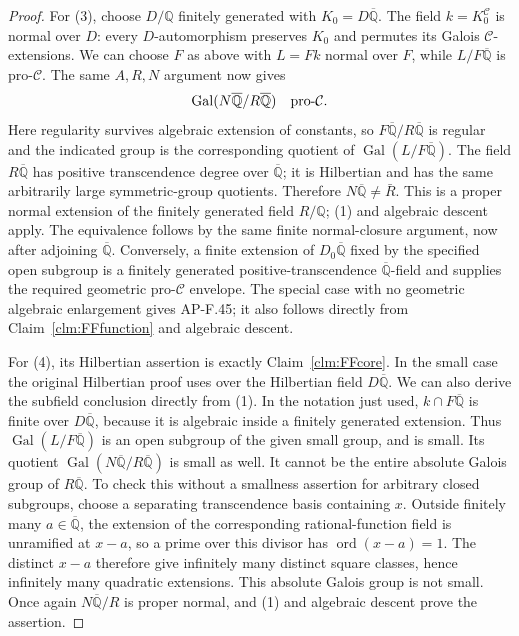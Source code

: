 \begin{proof}
For (3), choose \(D/\mathbb Q\) finitely generated with
\(K_0=D\overline{\mathbb Q}\). The field
\(k=K_0^{\mathcal C}\) is normal over \(D\): every
\(D\)-automorphism preserves \(K_0\) and permutes its
Galois \(\mathcal C\)-extensions. We can choose \(F\)
as above with \(L=Fk\) normal over \(F\), while
\(L/F\overline{\mathbb Q}\) is pro-\(\mathcal C\).
The same \(A,R,N\) argument now gives
\[
 \operatorname{Gal}
   (N\overline{\mathbb Q}/R\overline{\mathbb Q})
 \quad\hbox{pro-}\mathcal C.
\]
Here regularity survives algebraic extension of constants,
so \(F\overline{\mathbb Q}/R\overline{\mathbb Q}\)
is regular and the indicated group is the corresponding
quotient of \(\operatorname{Gal}
(L/F\overline{\mathbb Q})\). The field
\(R\overline{\mathbb Q}\) has positive transcendence
degree over \(\overline{\mathbb Q}\); it is Hilbertian
and has the same arbitrarily large symmetric-group quotients.
Therefore \(N\overline{\mathbb Q}\ne\bar R\).
This is a proper normal extension of the finitely generated
field \(R/\mathbb Q\); (1) and algebraic descent apply.
The equivalence follows by the same finite normal-closure
argument, now after adjoining \(\overline{\mathbb Q}\).
Conversely, a finite extension of
\(D_0\overline{\mathbb Q}\) fixed by the specified open
subgroup is a finitely generated positive-transcendence
\(\overline{\mathbb Q}\)-field and supplies the required
geometric pro-\(\mathcal C\) envelope. The special case
with no geometric algebraic enlargement gives AP-F.45;
it also follows directly from Claim~\ref{clm:FFfunction}
and algebraic descent.

For (4), its Hilbertian assertion is exactly
Claim~\ref{clm:FFcore}. In the small case the original
Hilbertian proof uses
\citet[Theorem~4.4]{FF_BarySoroker2008} over the Hilbertian
field \(D\overline{\mathbb Q}\). We can also derive
the subfield conclusion directly from (1).
In the notation just used, \(k\cap F\overline{\mathbb Q}\)
is finite over \(D\overline{\mathbb Q}\), because it
is algebraic inside a finitely generated extension.
Thus \(\operatorname{Gal}(L/F\overline{\mathbb Q})\)
is an open subgroup of the given small group, and is small.
Its quotient
\(\operatorname{Gal}(N\overline{\mathbb Q}/
R\overline{\mathbb Q})\) is small as well. It cannot
be the entire absolute Galois group of
\(R\overline{\mathbb Q}\). To check this without a
smallness assertion for arbitrary closed subgroups, choose
a separating transcendence basis containing \(x\).
Outside finitely many \(a\in\overline{\mathbb Q}\),
the extension of the corresponding rational-function field
is unramified at \(x-a\), so a prime over this divisor
has \(\operatorname{ord}(x-a)=1\). The distinct
\(x-a\) therefore give infinitely many distinct square
classes, hence infinitely many quadratic extensions.
This absolute Galois group is not small. Once again
\(N\overline{\mathbb Q}/R\) is proper normal, and (1)
and algebraic descent prove the assertion.


\end{proof}
